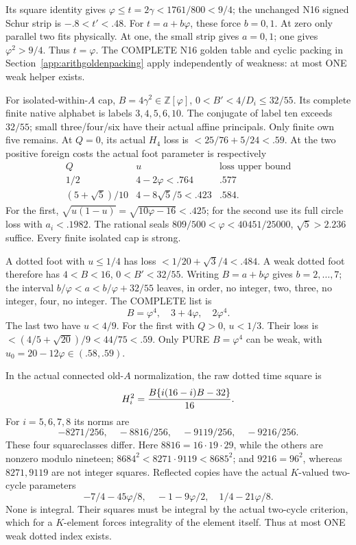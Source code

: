Its square identity gives
\(\varphi\le t=2\gamma<1761/800<9/4\);
the unchanged N16 signed Schur strip is
\(-.8<t'<.48\).
For \(t=a+b\varphi\), these force
\(b=0,1\).
At zero only parallel two fits physically.
At one, the small strip gives \(a=0,1\);
one gives \(\varphi^2>9/4\).
Thus \(t=\varphi\).
The COMPLETE N16 golden table and cyclic
packing in Section~\ref{app:arithgoldenpacking}
apply independently of weakness: at most
ONE weak helper exists.

For isolated-within-\(A\) cap,
\(B=4\gamma^2\in\mathbb Z[\varphi]\),
\(0<B'<4/D_i\le32/55\).
Its complete finite native alphabet is
labels \(3,4,5,6,10\).
The conjugate of label ten exceeds
\(32/55\); small three/four/six have
their actual affine principals.
Only finite own five remains.
At \(Q=0\), its actual \(H_4\) loss is
\(<25/76+5/24<.59\).
At the two positive foreign costs the
actual foot parameter is respectively
\[
 \begin{array}{c|c|c}
 Q&u&\text{loss upper bound}\\ \hline
 1/2&4-2\varphi<.764&.577\\
 (5+\sqrt5)/10&4-8\sqrt5/5<.423&.584 .
 \end{array}
\]
For the first,
\(\sqrt{u(1-u)}=\sqrt{10\varphi-16}<.425\);
for the second use its full circle loss
with \(a_i<.1982\).
The rational seals
\(809/500<\varphi<40451/25000\),
\(\sqrt5>2.236\) suffice.
Every finite isolated cap is strong.

A dotted foot with \(u\le1/4\) has loss
\(<1/20+\sqrt3/4<.484\).
A weak dotted foot therefore has
\(4<B<16\), \(0<B'<32/55\).
Writing \(B=a+b\varphi\) gives \(b=2,\ldots,7\);
the interval
\(b/\varphi<a<b/\varphi+32/55\)
leaves, in order, no integer, two, three,
no integer, four, no integer.
The COMPLETE list is
\[
                        B=\varphi^4,\quad3+4\varphi,\quad2\varphi^4 .
\]
The last two have \(u<4/9\).
For the first with \(Q>0\), \(u<1/3\).
Their loss is \(<(4/5+\sqrt{20})/9<44/75<.59\).
Only PURE \(B=\varphi^4\) can be weak,
with \(u_0=20-12\varphi\in(.58,.59)\).

In the actual connected old-\(A\) normalization,
the raw dotted time square is
\[
                  H_i^2={B\{i(16-i)B-32\}\over16}.
\]
For \(i=5,6,7,8\) its norms are
\[
                 -8271/256,\quad-8816/256,\quad-9119/256,\quad-9216/256 .
\]
These four squareclasses differ.
Here \(8816=16\cdot19\cdot29\), while the
others are nonzero modulo nineteen;
\(8684^2<8271\cdot9119<8685^2\);
and \(9216=96^2\), whereas \(8271,9119\)
are not integer squares.
Reflected copies have the actual
\(K\)-valued two-cycle parameters
\[
             -7/4-45\varphi/8,\quad-1-9\varphi/2,\quad
                                       1/4-21\varphi/8 .
\]
None is integral.
Their squares must be integral by the
actual two-cycle criterion, which for
a \(K\)-element forces integrality of the
element itself.
Thus at most ONE weak dotted index exists.

